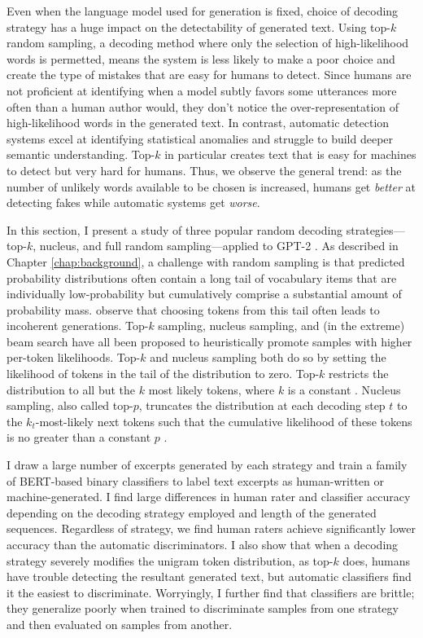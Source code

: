 Even when the language model used for generation is fixed, choice of decoding strategy has a huge impact on the detectability of generated text.
Using top-$k$ random sampling, a decoding method where only the selection of high-likelihood words is permetted, means the system is less likely to make a poor choice and create the type of mistakes that are easy for humans to detect.
Since humans are not proficient at identifying when a model subtly favors some utterances more often than a human author would, they don't notice the over-representation of high-likelihood words in the generated text.
In contrast, automatic detection systems excel at identifying statistical anomalies and struggle to build deeper semantic understanding.
Top-$k$ in particular creates text that is easy for machines to detect but very hard for humans.
Thus, we observe the general trend: as the number of unlikely words available to be chosen is increased, humans get {\em better} at detecting fakes while automatic systems get {\em worse}.

In this section, I present a study of three popular random decoding strategies---top-$k$, nucleus, and full random sampling---applied to GPT-2 \cite{radford2019language}.
As described in Chapter \ref{chap:background}, a challenge with random sampling is that predicted probability distributions often contain a long tail of vocabulary items that are individually low-probability but cumulatively comprise a substantial amount of probability mass.
\citet{holtzman2019curious} observe that choosing tokens from this tail often leads to incoherent generations.
Top-$k$ sampling, nucleus sampling, and (in the extreme) beam search have all been proposed to heuristically promote samples with higher per-token likelihoods.
Top-$k$ and nucleus sampling both do so by setting the likelihood of tokens in the tail of the distribution to zero.
Top-$k$ restricts the distribution to all but the $k$ most likely tokens, where $k$ is a constant \citep{fan2018hierarchical}.
Nucleus sampling, also called top-$p$, truncates the distribution at each decoding step $t$ to the $k_t$-most-likely next tokens such that the cumulative likelihood of these tokens is no greater than a constant $p$ \citep{holtzman2019curious}.

I draw a large number of excerpts generated by each strategy and train a family of BERT-based \cite{devlin2018bert} binary classifiers to label text excerpts as human-written or machine-generated.
I find large differences in human rater and classifier accuracy depending on the decoding strategy employed and length of the generated sequences.
Regardless of strategy, we find human raters achieve significantly lower accuracy than the automatic discriminators.
I also show that when a decoding strategy severely modifies the unigram token distribution, as top-$k$ does, humans have trouble detecting the resultant generated text, but automatic classifiers find it the easiest to discriminate.
Worryingly, I further find that classifiers are brittle; they generalize poorly when trained to discriminate samples from one strategy and then evaluated on samples from another.


